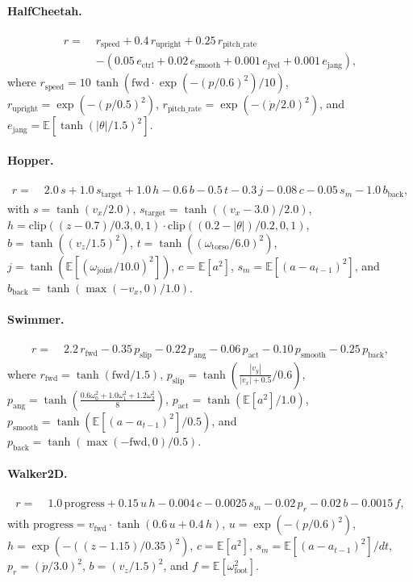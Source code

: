 \paragraph{HalfCheetah.}
\begin{align*}
r \!=\;& r_{\text{speed}} + 0.4\,r_{\text{upright}} + 0.25\,r_{\text{pitch\_rate}} \\
&- (0.05\,e_{\text{ctrl}} + 0.02\,e_{\text{smooth}} + 0.001\,e_{\text{jvel}} + 0.001\,e_{\text{jang}}),
\end{align*}
where $r_{\text{speed}} = 10\,\tanh(\mathrm{fwd}\cdot \exp(-(p/0.6)^2)/10)$, $r_{\text{upright}}=\exp(-(p/0.5)^2)$, $r_{\text{pitch\_rate}}=\exp(-(\dot p/2.0)^2)$, and $e_{\text{jang}}=\mathbb{E}[\tanh(|\theta|/1.5)^2]$.

\paragraph{Hopper.}
\begin{align*}
r \!=\;& 2.0\,s + 1.0\,s_{\text{target}} + 1.0\,h
 -0.6\,b -0.5\,t -0.3\,j -0.08\,c -0.05\,s_m -1.0\,b_{\text{back}},
\end{align*}
with $s=\tanh(v_x/2.0)$, $s_{\text{target}}=\tanh((v_x-3.0)/2.0)$, $h=\mathrm{clip}((z-0.7)/0.3,0,1)\cdot \mathrm{clip}((0.2-|{\theta}|)/0.2,0,1)$, $b=\tanh((v_z/1.5)^2)$, $t=\tanh((\omega_{\text{torso}}/6.0)^2)$, $j=\tanh(\mathbb{E}[(\omega_{\text{joint}}/10.0)^2])$, $c=\mathbb{E}[a^2]$, $s_m=\mathbb{E}[(a-a_{t-1})^2]$, and $b_{\text{back}}=\tanh(\max(-v_x,0)/1.0)$.

\paragraph{Swimmer.}
\begin{align*}
r \!=\;& 2.2\,r_{\text{fwd}} -0.35\,p_{\text{slip}} -0.22\,p_{\text{ang}} -0.06\,p_{\text{act}} -0.10\,p_{\text{smooth}} -0.25\,p_{\text{back}},
\end{align*}
where $r_{\text{fwd}}=\tanh(\mathrm{fwd}/1.5)$, $p_{\text{slip}}=\tanh\!\left(\frac{|v_y|}{|v_x|+0.5}/0.6\right)$, $p_{\text{ang}}=\tanh\!\left(\frac{0.6\omega_0^2+1.0\omega_1^2+1.2\omega_2^2}{8}\right)$, $p_{\text{act}}=\tanh(\mathbb{E}[a^2]/1.0)$, $p_{\text{smooth}}=\tanh(\mathbb{E}[(a-a_{t-1})^2]/0.5)$, and $p_{\text{back}}=\tanh(\max(-\mathrm{fwd},0)/0.5)$.

\paragraph{Walker2D.}
\begin{align*}
r \!=\;& 1.0\,\mathrm{progress} + 0.15\,u\,h
 -0.004\,c -0.0025\,s_m -0.02\,p_r -0.02\,b -0.0015\,f ,
\end{align*}
with $\mathrm{progress}=v_{\text{fwd}}\cdot\tanh(0.6\,u+0.4\,h)$, $u=\exp(-(p/0.6)^2)$, $h=\exp(-((z-1.15)/0.35)^2)$, $c=\mathbb{E}[a^2]$, $s_m=\mathbb{E}[(a-a_{t-1})^2]/dt$, $p_r=(\dot p/3.0)^2$, $b=(v_z/1.5)^2$, and $f=\mathbb{E}[\omega_{\text{foot}}^2]$.

